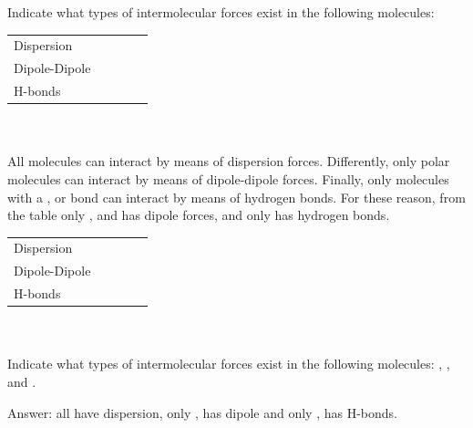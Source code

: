 \documentclass[main.tex]{subfiles}
\begin{document}
\begin{description}
\begin{example} %
Indicate what types of intermolecular forces exist in the following molecules:
\begin{tabularx}{\textwidth}{
    >{\centering}m{.185\linewidth} 
    *{4}{Y} }
  \toprule
 &   &    & &    \\
    \midrule
   Dispersion & 	 &		 &    &		   \\
  Dipole-Dipole& 	 &		&     &		     \\
      H-bonds & 	 &		 &    &		\\    
    \bottomrule
\end{tabularx}
\\
\\
All molecules can interact by means of dispersion forces. Differently, only polar molecules can interact by means of dipole-dipole forces. Finally, only molecules with a  ,  or  bond can interact by means of hydrogen bonds. For these reason, from the table only ,   and  has dipole forces, and only  has hydrogen bonds.
\begin{tabularx}{\textwidth}{
    >{\centering}m{.185\linewidth} 
    *{4}{Y} }
  \toprule
 &   &    & &    \\
    \midrule
   Dispersion & 	\checkmark &	\checkmark	 & \checkmark   &\checkmark		   \\
  Dipole-Dipole&  \checkmark	 &	\xmark 	& \checkmark    &\checkmark		     \\
      H-bonds & 	\xmark  &\xmark 		 &\checkmark    &\xmark 		\\    
    \bottomrule
\end{tabularx}
\\
\faDiamond\ \\
Indicate what types of intermolecular forces exist in the following molecules: , , and .
\begin{flushright} Answer: all have dispersion, only ,  has dipole and only ,  has H-bonds.\end{flushright}
\end{example}%




\end{description}
\end{document}
